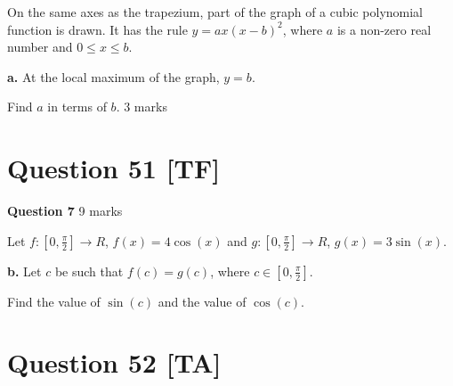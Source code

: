 \documentclass[10pt,a4paper]{article}
\begin{document}
\begin{center}
\end{center}

On the same axes as the trapezium, part of the graph of a cubic polynomial function is drawn. It has the rule $y = ax(x-b)^2$, where $a$ is a non-zero real number and $0 \leq x \leq b$.

\textbf{a.} At the local maximum of the graph, $y = b$.

Find $a$ in terms of $b$. \hfill 3 marks

\vspace{9\baselineskip}

\hrulefill

\section*{Question 51 [TF]}

\textbf{Question 7} \hfill 9 marks

Let $f : \left[0, \frac{\pi}{2}\right] \to R$, $f(x) = 4\cos(x)$ and $g : \left[0, \frac{\pi}{2}\right] \to R$, $g(x) = 3\sin(x)$.

\textbf{b.} Let $c$ be such that $f(c) = g(c)$, where $c \in \left[0, \frac{\pi}{2}\right]$.

Find the value of $\sin(c)$ and the value of $\cos(c)$.

\vspace{9\baselineskip}

\hrulefill

\section*{Question 52 [TA]}
\end{document}
